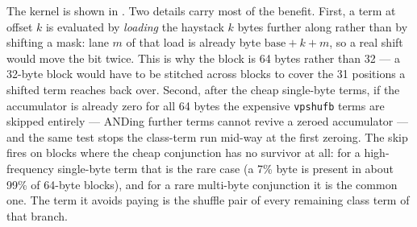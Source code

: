 \documentclass[11pt,letterpaper]{article}
\begin{document}
The kernel is shown in . Two details carry most of the
benefit. First, a term at offset $k$ is evaluated by \emph{loading} the
haystack $k$ bytes further along rather than by shifting a mask: lane $m$ of
that load is already byte $\text{base}+k+m$, so a real shift would move the
bit twice. This is why the block is 64 bytes rather than 32 --- a 32-byte
block would have to be stitched across blocks to cover the 31 positions a
shifted term reaches back over. Second, after the cheap single-byte terms,
if the accumulator is already zero for all 64 bytes the expensive
\texttt{vpshufb} terms are skipped entirely --- ANDing further terms cannot
revive a zeroed accumulator --- and the same test stops the class-term run
mid-way at the first zeroing. The skip fires on blocks where the cheap
conjunction has no survivor at all: for a high-frequency single-byte term
that is the rare case (a 7\% byte is present in about 99\% of 64-byte
blocks), and for a rare multi-byte conjunction it is the common one. The
term it avoids paying is the shuffle pair of every remaining class term of
that branch.
\end{document}
